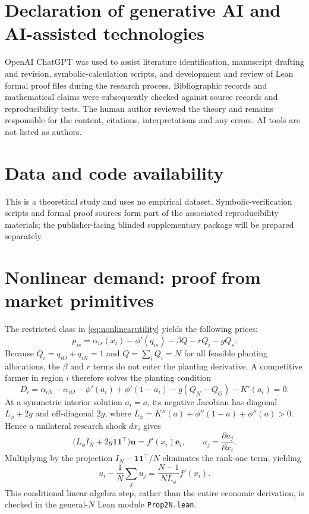 \documentclass[11pt,a4paper]{article}
\begin{document}
\section*{Declaration of generative AI and AI-assisted technologies}
OpenAI ChatGPT was used to assist literature identification, manuscript drafting and revision, symbolic-calculation scripts, and development and review of Lean formal proof files during the research process. Bibliographic records and mathematical claims were subsequently checked against source records and reproducibility tests. The human author reviewed the theory and remains responsible for the content, citations, interpretations and any errors. AI tools are not listed as authors.

\section*{Data and code availability}
This is a theoretical study and uses no empirical dataset. Symbolic-verification scripts and formal proof sources form part of the associated reproducibility materials; the publisher-facing blinded supplementary package will be prepared separately.




\appendix
\section{Nonlinear demand: proof from market primitives}
\label{app:nonlinearproof}
The restricted class in \eqref{eq:nonlinearutility} yields the following prices:
\begin{equation}
 p_{is}=\alpha_{is}(x_i)-\phi'(q_{is})-\beta Q-rQ_i-gQ_s.
 \label{eq:appprice}
\end{equation}
Because $Q_i=q_{iO}+q_{iN}=1$ and $Q=\sum_i Q_i=N$ for all feasible planting allocations, the $\beta$ and $r$ terms do not enter the planting derivative. A competitive farmer in region $i$ therefore solves the planting condition
\begin{equation}
D_i=\alpha_{iN}-\alpha_{iO}
 -\phi'(a_i)+\phi'(1-a_i)
 -g(Q_N-Q_O)-K'(a_i)=0.
\label{eq:appD}
\end{equation}
At a symmetric interior solution $a_i=a$, its negative Jacobian has diagonal $L_\phi+2g$ and off-diagonal $2g$, where $L_\phi=K''(a)+\phi''(1-a)+\phi''(a)>0$. Hence a unilateral research shock $dx_i$ gives
\begin{equation}
 \big(L_\phi I_N+2g\mathbf1\mathbf1^\top\big)\mathbf u
 =f'(x_i)\mathbf e_i,\qquad
 u_j=\frac{\partial a_j}{\partial x_i}.
 \label{eq:appJ}
\end{equation}
Multiplying by the projection $I_N-\mathbf1\mathbf1^\top/N$ eliminates the rank-one term, yielding
\begin{equation}
u_i-\frac1N\sum_j u_j
=\frac{N-1}{NL_\phi}f'(x_i).
\label{eq:appcontrast}
\end{equation}
This conditional linear-algebra step, rather than the entire economic derivation, is checked in the general-$N$ Lean module \texttt{Prop2N.lean}.
\end{document}
